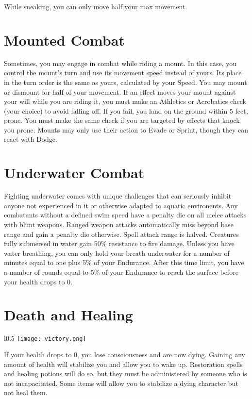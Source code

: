 While sneaking, you can only move half your max movement.

\section{Mounted Combat}
Sometimes, you may engage in combat while riding a mount. In this case, you control the mount's turn and use its movement speed instead of yours. Its place in the turn order is the same as yours, calculated by your Speed. You may mount or dismount for half of your movement. If an effect moves your mount against your will while you are riding it, you must make an Athletics or Acrobatics check (your choice) to avoid falling off. If you fail, you land on the ground within 5 feet, prone. You must make the same check if you are targeted by effects that knock you prone. Mounts may only use their action to Evade or Sprint, though they can react with Dodge.

\section{Underwater Combat}
Fighting underwater comes with unique challenges that can seriously inhibit anyone not experienced in it or otherwise adapted to aquatic environents. Any combatants without a defined swim speed have a penalty die on all melee attacks with blunt weapons. Ranged weapon attacks automatically miss beyond base range and gain a penalty die otherwise. Spell attack range is halved. Creatures fully submersed in water gain 50\% resistance to fire damage. Unless you have water breathing, you can only hold your breath underwater for a number of minutes equal to one plus 5\% of your Endurance. After this time limit, you have a number of rounds equal to 5\% of your Endurance to reach the surface before your health drops to 0.

\section{Death and Healing}
\begin{wrapfigure}{l}{0.5\textwidth}
	\texttt{[image: victory.png]}
\end{wrapfigure}
If your health drops to 0, you lose consciousness and are now dying. Gaining any amount of health will stabilize you and allow you to wake up. Restoration spells and healing potions will do so, but they must be administered by someone who is not incapacitated. Some items will allow you to stabilize a dying character but not heal them.\\

